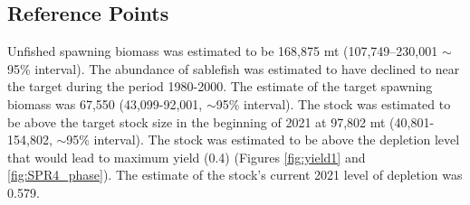 \documentclass[11pt,
  english,
  a4paper,
]{article}
\begin{document}
\tagmcend\tagstructend

\clearpage


\hypertarget{reference-points}{%
\subsection*{Reference Points}\label{reference-points}}

\leavevmode\tagmcend\tagstructend

Unfished spawning biomass was estimated to be 168,875 mt (107,749–230,001 $\sim$95\% interval). The abundance of sablefish was estimated to have declined to near the target during the period 1980-2000. The estimate of the target spawning biomass was 67,550 (43,099-92,001, $\sim$95\%  interval). The stock was estimated to be  above the target stock size in the beginning of 2021 at 97,802 mt (40,801-154,802, $\sim$95\% interval). The stock was estimated to be above the depletion level that would lead to maximum yield (0.4) (Figures \ref{fig:yield1} and \ref{fig:SPR4_phase}). The estimate of the stock's current 2021 level of depletion was 0.579.

\quad

\begingroup\fontsize{10}{12}\selectfont
\begingroup\fontsize{10}{12}\selectfont
\end{document}
